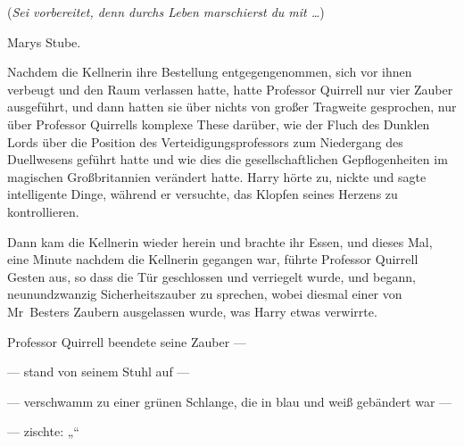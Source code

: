 (\emph{Sei vorbereitet, denn durchs Leben marschierst du mit …})

Marys Stube.

Nachdem die Kellnerin ihre Bestellung entgegengenommen, sich vor ihnen verbeugt und den Raum verlassen hatte, hatte Professor Quirrell nur vier Zauber ausgeführt, und dann hatten sie über nichts von großer Tragweite gesprochen, nur über Professor Quirrells komplexe These darüber, wie der Fluch des Dunklen Lords über die Position des Verteidigungsprofessors zum Niedergang des Duellwesens geführt hatte und wie dies die gesellschaftlichen Gepflogenheiten im magischen Großbritannien verändert hatte. Harry hörte zu, nickte und sagte intelligente Dinge, während er versuchte, das Klopfen seines Herzens zu kontrollieren.

Dann kam die Kellnerin wieder herein und brachte ihr Essen, und dieses Mal, eine Minute nachdem die Kellnerin gegangen war, führte Professor Quirrell Gesten aus, so dass die Tür geschlossen und verriegelt wurde, und begann, neunundzwanzig Sicherheitszauber zu sprechen, wobei diesmal einer von Mr~Besters Zaubern ausgelassen wurde, was Harry etwas verwirrte.

Professor Quirrell beendete seine Zauber —

— stand von seinem Stuhl auf —

— verschwamm zu einer grünen Schlange, die in blau und weiß gebändert war —

— zischte: „“

